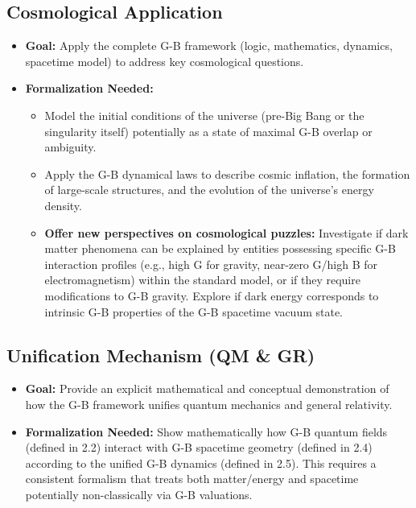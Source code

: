 \documentclass{article}
\begin{document}
\subsection{Cosmological Application}
\begin{itemize}
    \item \textbf{Goal:} Apply the complete G-B framework (logic, mathematics, dynamics, spacetime model) to address key cosmological questions.
    \item \textbf{Formalization Needed:}
        \begin{itemize}
            \item Model the initial conditions of the universe (pre-Big Bang or the singularity itself) potentially as a state of maximal G-B overlap or ambiguity.
            \item Apply the G-B dynamical laws to describe cosmic inflation, the formation of large-scale structures, and the evolution of the universe's energy density.
            \item \textbf{Offer new perspectives on cosmological puzzles:} Investigate if dark matter phenomena can be explained by entities possessing specific G-B interaction profiles (e.g., high G for gravity, near-zero G/high B for electromagnetism) within the standard model, or if they require modifications to G-B gravity. Explore if dark energy corresponds to intrinsic G-B properties of the G-B spacetime vacuum state.
        \end{itemize}
\end{itemize}

\subsection{Unification Mechanism (QM \& GR)}
\begin{itemize}
    \item \textbf{Goal:} Provide an explicit mathematical and conceptual demonstration of how the G-B framework unifies quantum mechanics and general relativity.
    \item \textbf{Formalization Needed:} Show mathematically how G-B quantum fields (defined in 2.2) interact with G-B spacetime geometry (defined in 2.4) according to the unified G-B dynamics (defined in 2.5). This requires a consistent formalism that treats both matter/energy and spacetime potentially non-classically via G-B valuations.
\end{itemize}
\end{document}
